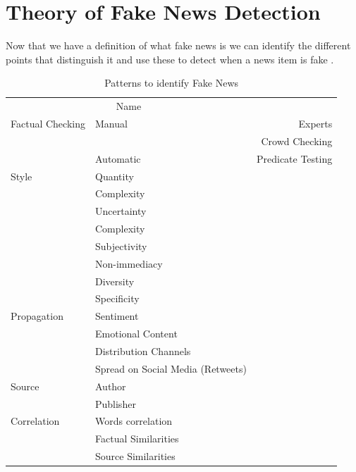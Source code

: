 \documentclass[10pt, a4paper, twocolumn]{article} %
\begin{document}
\section{Theory of Fake News Detection}
Now that we have a definition of what fake news is we can identify the different points that distinguish it and use these to detect when a news item is fake \cite{zhou2020}.
\begin{table}
	\caption{Patterns to identify Fake News}
	\centering
	\begin{tabular}{llr}
		\toprule
		\multicolumn{2}{c}{Name} \\
		\cmidrule(r){1-2}
		Factual Checking       & Manual    & Experts  \\
		                       &           & Crowd Checking \\
		                       & Automatic & Predicate Testing \\
                Style                  & Quantity  & \\
                                       & Complexity & \\
                                       & Uncertainty & \\
                                       & Complexity & \\
                                       & Subjectivity & \\
                                       & Non-immediacy & \\
                                       & Diversity & \\
                                       & Specificity & \\
                Propagation            & Sentiment & \\
                                       & Emotional Content & \\
                                       & Distribution Channels & \\
                                       & Spread on Social Media (Retweets) & \\
                Source                 & Author & \\
                                       & Publisher & \\
                Correlation            & Words correlation & \\
                                       & Factual Similarities & \\
                                       & Source Similarities & \\
		\bottomrule
	\end{tabular}
\end{table}
\end{document}
